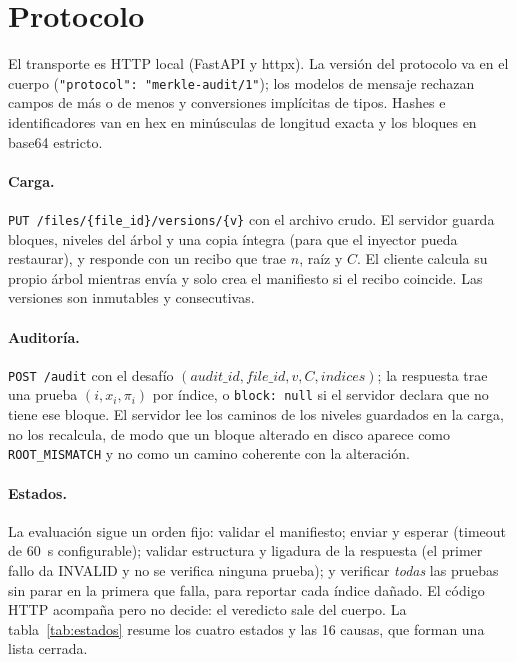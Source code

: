 \documentclass[11pt,a4paper]{article}
\newcommand{\code}[1]{\texttt{#1}}
\newcommand{\cause}[1]{\texttt{\small #1}}
\begin{document}
\section{Protocolo}
\label{sec:protocolo}

El transporte es HTTP local (FastAPI y httpx). La versión del protocolo va en el cuerpo
(\code{"protocol": "merkle-audit/1"}); los modelos de mensaje rechazan campos de más o de menos y
conversiones implícitas de tipos. Hashes e identificadores van en hex en minúsculas de longitud
exacta y los bloques en base64 estricto.

\paragraph{Carga.} \code{PUT /files/\{file\_id\}/versions/\{v\}} con el archivo crudo. El servidor
guarda bloques, niveles del árbol y una copia íntegra (para que el inyector pueda restaurar), y
responde con un recibo que trae $n$, raíz y $C$. El cliente calcula su propio árbol mientras envía y
solo crea el manifiesto si el recibo coincide. Las versiones son inmutables y consecutivas.

\paragraph{Auditoría.} \code{POST /audit} con el desafío
$(\mathit{audit\_id},\mathit{file\_id},v,C,\mathit{indices})$; la respuesta trae una prueba
$(i, x_i, \pi_i)$ por índice, o \code{block: null} si el servidor declara que no tiene ese bloque.
El servidor lee los caminos de los niveles guardados en la carga, no los recalcula, de modo que un
bloque alterado en disco aparece como \cause{ROOT\_MISMATCH} y no como un camino coherente con la
alteración.

\paragraph{Estados.} La evaluación sigue un orden fijo: validar el manifiesto; enviar y esperar
(timeout de 60~s configurable); validar estructura y ligadura de la respuesta (el primer fallo da
INVALID y no se verifica ninguna prueba); y verificar \emph{todas} las pruebas sin parar en la
primera que falla, para reportar cada índice dañado. El código HTTP acompaña pero no decide: el
veredicto sale del cuerpo. La tabla~\ref{tab:estados} resume los cuatro estados y las 16 causas, que
forman una lista cerrada.
\end{document}
